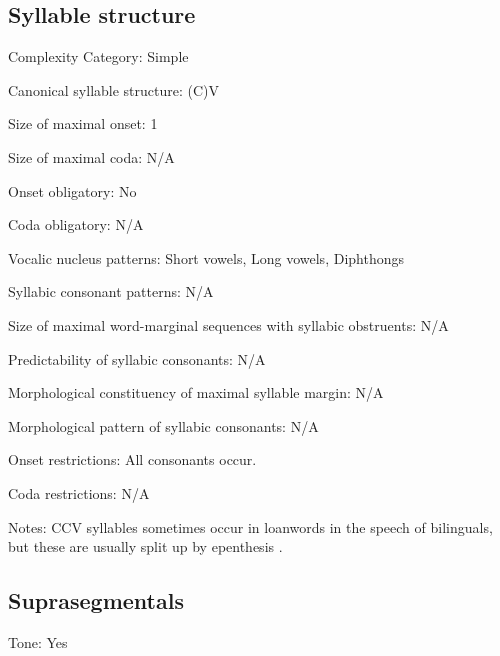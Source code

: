 {\subsection*{Syllable structure}
\begin{appendixdesc}

\item[Complexity Category:] Simple

\item[Canonical syllable structure:] (C)V \citep[75--76]{Olawsky2006}

\item[Size of maximal onset:] 1

\item[Size of maximal coda:] N/A

\item[Onset obligatory:] No

\item[Coda obligatory:] N/A

\item[Vocalic nucleus patterns:] Short vowels, Long vowels, Diphthongs

\item[Syllabic consonant patterns:] N/A

\item[Size of maximal word-marginal sequences with syllabic obstruents:] N/A

\item[Predictability of syllabic consonants:] N/A

\item[Morphological constituency of maximal syllable margin:] N/A

\item[Morphological pattern of syllabic consonants:] N/A

\item[Onset restrictions:] All consonants occur.

\item[Coda restrictions:] N/A

\item[Notes:] CCV syllables sometimes occur in  loanwords in the speech of bilinguals, but these are usually split up by epenthesis \citep[76]{Olawsky2006}.
\end{appendixdesc}
\subsection*{Suprasegmentals}
\begin{appendixdesc}
\item[Tone:] Yes


\end{appendixdesc}}
